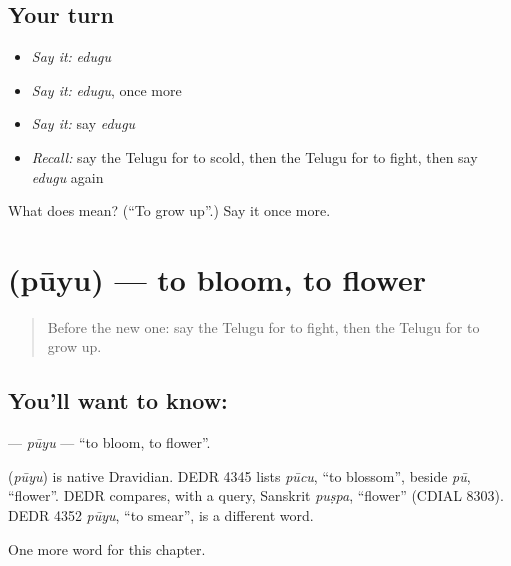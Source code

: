 \subsection*{Your turn}
\begin{itemize}
\raggedright
  \item \emph{Say it:} \emph{edugu}
  \item \emph{Say it:} \emph{edugu}, once more
  \item \emph{Say it:} say \emph{edugu}
  \item \emph{Recall:} say the Telugu for to scold, then the Telugu for to fight, then say \emph{edugu} again
\end{itemize}

\begin{tcolorbox}[breakable,colback=teal!4,colframe=teal!35!black,title={Before you move on}]
What does  mean? (\textquotedblleft{}To grow up\textquotedblright{}.) Say it once more.
\end{tcolorbox}
\section[\texorpdfstring{\te{పూయు} (pūyu)}{పూయు (pūyu)}]{ (pūyu) — to bloom, to flower}

\label{lesson:TE-C203-puyu}



\begin{quote}
Before the new one: say the Telugu for to fight, then the Telugu for to grow up.
\end{quote}

\subsection*{You'll want to know: }
\textbf{} — \emph{pūyu} — \textquotedblleft{}to bloom, to flower\textquotedblright{}.

\begin{cousinweb}
\textbf{} (\emph{pūyu}) is native Dravidian. DEDR 4345 lists \emph{pūcu}, \textquotedblleft{}to blossom\textquotedblright{}, beside \emph{pū}, \textquotedblleft{}flower\textquotedblright{}. DEDR compares, with a query, Sanskrit \emph{puṣpa}, \textquotedblleft{}flower\textquotedblright{} (CDIAL 8303). DEDR 4352 \emph{pūyu}, \textquotedblleft{}to smear\textquotedblright{}, is a different word.
\end{cousinweb}

\begin{grammarlens}[title={What you've built}]
One more word for this chapter.
\end{grammarlens}

